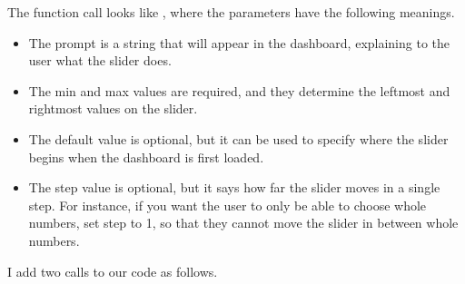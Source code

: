 \documentclass[letterpaper,10pt,english]{sphinxmanual}
\begin{document}
The function call looks like , where the parameters have the following meanings.
\begin{itemize}
\item {} 
The prompt is a string that will appear in the dashboard, explaining to the user what the slider does.

\item {} 
The min and max values are required, and they determine the leftmost and rightmost values on the slider.

\item {} 
The default value is optional, but it can be used to specify where the slider begins when the dashboard is first loaded.

\item {} 
The step value is optional, but it says how far the slider moves in a single step.  For instance, if you want the user to only be able to choose whole numbers, set step to 1, so that they cannot move the slider in between whole numbers.

\end{itemize}

I add two  calls to our code as follows.
\end{document}
